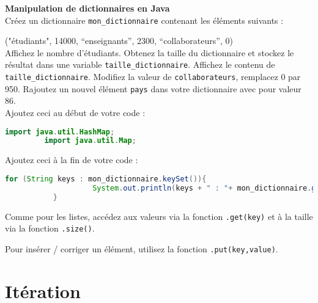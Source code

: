     \begin{Exercice}[15 minutes] \textbf{Manipulation de dictionnaires en Java}\\
      	Créez un dictionnaire \lstinline{mon_dictionnaire} contenant les éléments suivants :
      	
      	("étudiants", 14000, ``enseignants'', 2300, ``collaborateurs'', 0)\\
      	
          Affichez le nombre d'étudiants. Obtenez la taille du dictionnaire et stockez le résultat dans une variable \lstinline{taille_dictionnaire}. Affichez le contenu de \lstinline{taille_dictionnaire}. 
          Modifiez la valeur de \lstinline{collaborateurs}, remplacez 0 par 950. Rajoutez un nouvel élément \lstinline{pays} dans votre dictionnaire avec pour valeur 86.\\
      	
      	Ajoutez ceci au début de votre code :
       
      	\begin{lstlisting}[language=Java]
             import java.util.HashMap;
	     import java.util.Map; \end{lstlisting}
	     
	     Ajoutez ceci à la fin de votre code :
	     
	    \begin{lstlisting}[language=Java]
             for (String keys : mon_dictionnaire.keySet()){
            		System.out.println(keys + " : "+ mon_dictionnaire.get(keys));
	       } \end{lstlisting} 
    
        \begin{conseil}
           Comme pour les listes, accédez aux valeurs via la fonction \lstinline{.get(key)} et à la taille via la fonction \lstinline{.size()}.
            
           Pour insérer / corriger un élément, utilisez la fonction \lstinline{.put(key,value)}.
        \end{conseil}
        
        \begin{solution}
            
        \end{solution}
    \end{Exercice}
    
 
    \section{Itération}
    
